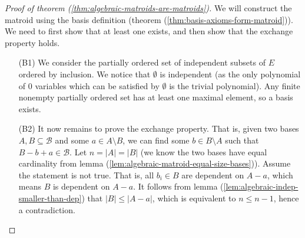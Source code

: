 \begin{proof}[Proof of theorem (\ref{thm:algebraic-matroids-are-matroids})]
	We will construct the matroid using the basis definition (theorem (\ref{thm:basis-axioms-form-matroid})). We need to first show that at least one exists, and then show that the exchange property holds.
	\begin{enumerate}
		\item[(B1)] We consider the partially ordered set of independent subsets of $E$ ordered by inclusion. We notice that $ \emptyset $ is independent (as the only polynomial of $0$ variables which can be satisfied by $\emptyset $ is the trivial polynomial). Any finite nonempty partially ordered set has at least one maximal element, so a basis exists.
		\item[(B2)] It now remains to prove the exchange property. That is, given two bases $A, B \subseteq \mathcal B$ and some $a \in A \setminus B$, we can find some $b \in B \setminus A$ such that $B - b + a \in \mathcal B$. Let $n = |A| = |B|$ (we know the two bases have equal cardinality from lemma (\ref{lem:algebraic-matroid-equal-size-bases})). Assume the statement is not true. That is, all $b _i \in B$ are dependent on $A - a$, which means $B$ is dependent on $A - a$. It follows from lemma (\ref{lem:algebraic-indep-smaller-than-dep}) that $|B| \leq |A - a|$, which is equivalent to $n \leq n - 1$, hence a contradiction.
	\end{enumerate}
\end{proof}


